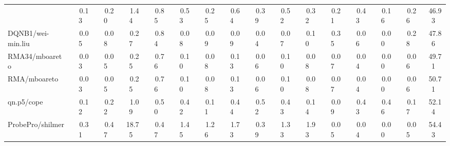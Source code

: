 \begin{table}[hptb]
\begin{center}
\begin{tabular}{|l||c|c|c|c|c|c|c|c|c|c|c|c|c|c|c|}
{dChip/rafa&~~0.13&~~0.20&~~1.44&~~0.85&~~0.53&~~0.25&~~0.64&~~0.39&~~0.52&~~0.32&~~0.21&~~0.43&~~0.16&~~0.26&~46.93\\ 
DQNB1/wei-min.liu&~~0.05&~~0.08&~~0.27&~~0.84&~~0.08&~~0.09&~~0.09&~~0.04&~~0.07&~~0.10&~~0.35&~~0.06&~~0.00&~~0.28&~47.86\\ 
RMA34/mboareto&~~0.03&~~0.05&~~0.25&~~0.76&~~0.10&~~0.08&~~0.13&~~0.06&~~0.10&~~0.08&~~0.07&~~0.04&~~0.00&~~0.06&~49.71\\ 
RMA/mboareto&~~0.03&~~0.05&~~0.25&~~0.76&~~0.10&~~0.08&~~0.13&~~0.06&~~0.10&~~0.08&~~0.07&~~0.04&~~0.00&~~0.06&~50.71\\ 
qn.p5/cope&~~0.12&~~0.22&~~1.09&~~0.50&~~0.42&~~0.11&~~0.44&~~0.52&~~0.43&~~0.14&~~0.09&~~0.43&~~0.46&~~0.17&~52.14\\ 
ProbePro/shilmer&~~0.31&~~0.47&~18.75&~~0.47&~~1.45&~~1.26&~~1.73&~~0.39&~~1.33&~~1.93&~~0.05&~~0.04&~~0.00&~~0.05&~54.43\\ 
\hline
\end{tabular}
\end{center}
\end{table}
